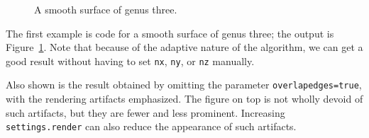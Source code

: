 \documentclass{article}
\begin{document}
\begin{figure}
\begin{minipage}{8.8cm}
\end{minipage}
\caption{A smooth surface of genus three.}\label{figure:genus3}
\end{figure}
The first example is code for a smooth surface of genus three;
the output is Figure~\ref{figure:genus3}. Note that because of 
the adaptive nature of the algorithm, we can get a good result 
without having to set \lstinline!nx!, \lstinline!ny!, or 
\lstinline!nz! manually.

Also shown is the result obtained by omitting the parameter \lstinline!overlapedges=true!, with the rendering artifacts emphasized. The figure 
on top is not wholly devoid of such artifacts, but they are fewer and 
less prominent.
Increasing \lstinline!settings.render! can also reduce the appearance 
of such artifacts.
\end{document}

